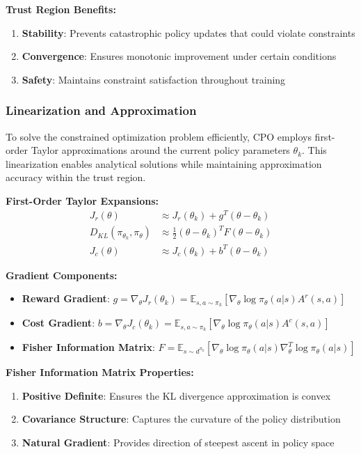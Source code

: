 \documentclass[12pt]{article}
\begin{document}
{{{{\textbf{Trust Region Benefits:}
\begin{enumerate}
\item \textbf{Stability}: Prevents catastrophic policy updates that could violate constraints
\item \textbf{Convergence}: Ensures monotonic improvement under certain conditions
\item \textbf{Safety}: Maintains constraint satisfaction throughout training
\end{enumerate}

\subsubsection{Linearization and Approximation}

To solve the constrained optimization problem efficiently, CPO employs first-order Taylor approximations around the current policy parameters $\theta_k$. This linearization enables analytical solutions while maintaining approximation accuracy within the trust region.

\textbf{First-Order Taylor Expansions:}
\begin{align}
J_r(\theta) &\approx J_r(\theta_k) + g^T(\theta - \theta_k) \\
D_{KL}(\pi_{\theta_k}, \pi_\theta) &\approx \frac{1}{2}(\theta - \theta_k)^T F (\theta - \theta_k) \\
J_c(\theta) &\approx J_c(\theta_k) + b^T(\theta - \theta_k)
\end{align}

\textbf{Gradient Components:}
\begin{itemize}
\item \textbf{Reward Gradient}: $g = \nabla_\theta J_r(\theta_k) = \mathbb{E}_{s,a \sim \pi_k}[\nabla_\theta \log \pi_\theta(a|s) A^r(s,a)]$
\item \textbf{Cost Gradient}: $b = \nabla_\theta J_c(\theta_k) = \mathbb{E}_{s,a \sim \pi_k}[\nabla_\theta \log \pi_\theta(a|s) A^c(s,a)]$
\item \textbf{Fisher Information Matrix}: $F = \mathbb{E}_{s \sim d^{\pi_k}}[\nabla_{\theta} \log \pi_{\theta}(a|s) \nabla_{\theta}^T \log \pi_{\theta}(a|s)]$
\end{itemize}

\textbf{Fisher Information Matrix Properties:}
\begin{enumerate}
\item \textbf{Positive Definite}: Ensures the KL divergence approximation is convex
\item \textbf{Covariance Structure}: Captures the curvature of the policy distribution
\item \textbf{Natural Gradient}: Provides direction of steepest ascent in policy space
\end{enumerate}

}}}}
\end{document}
